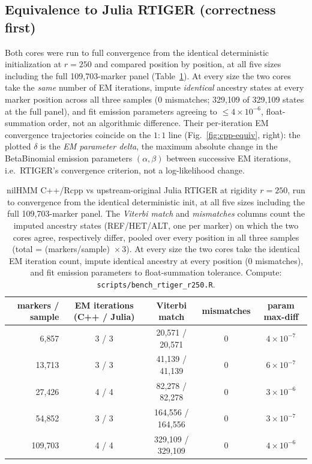 \documentclass[11pt]{article}
\newcommand{\code}[1]{\texttt{#1}}
\begin{document}
\subsection{Equivalence to Julia RTIGER (correctness first)}
Both cores were run to full convergence from the identical deterministic
initialization at $r=250$ and compared position by position, at all five sizes
including the full 109{,}703-marker panel (Table~\ref{tab:cpp-equiv}). At every size
the two cores take the \emph{same} number of EM iterations, impute \emph{identical}
ancestry states at every marker position across all three samples (0 mismatches;
329{,}109 of 329{,}109 states at the full panel), and fit emission parameters
agreeing to $\le 4\times10^{-6}$, float-summation order, not an algorithmic
difference. Their per-iteration EM convergence
trajectories coincide on the $1{:}1$ line (Fig.~\ref{fig:cpp-equiv}, right): the
plotted $\delta$ is the \emph{EM parameter delta}, the maximum absolute change in
the BetaBinomial emission parameters $(\alpha,\beta)$ between successive EM
iterations, i.e.\ RTIGER's convergence criterion, not a log-likelihood change.

\begin{table}[htbp]
\centering
\small
\begin{tabular}{@{}r c c c c@{}}
\toprule
markers / sample & EM iterations (C++ / Julia) & Viterbi match & mismatches & param max-diff \\
\midrule
6{,}857   & 3 / 3 & 20{,}571 / 20{,}571   & 0 & $4\times10^{-7}$ \\
13{,}713  & 3 / 3 & 41{,}139 / 41{,}139   & 0 & $6\times10^{-7}$ \\
27{,}426  & 4 / 4 & 82{,}278 / 82{,}278   & 0 & $3\times10^{-6}$ \\
54{,}852  & 3 / 3 & 164{,}556 / 164{,}556 & 0 & $3\times10^{-7}$ \\
109{,}703 & 4 / 4 & 329{,}109 / 329{,}109 & 0 & $4\times10^{-6}$ \\
\bottomrule
\end{tabular}
\caption{nilHMM C++/Rcpp vs upstream-original Julia RTIGER at rigidity $r=250$, run
to convergence from the identical deterministic init, at all five sizes including the
full 109{,}703-marker panel. The \emph{Viterbi match} and \emph{mismatches} columns
count the imputed ancestry states (REF/HET/ALT, one per marker) on which the two
cores agree, respectively differ, pooled over every position in all three samples
(total = (markers/sample)~$\times\,3$). At every size the two cores take the
identical EM iteration count, impute identical ancestry at every position (0
mismatches), and fit emission parameters to float-summation tolerance. Compute:
\code{scripts/bench\_rtiger\_r250.R}.}
\label{tab:cpp-equiv}
\end{table}
\end{document}
